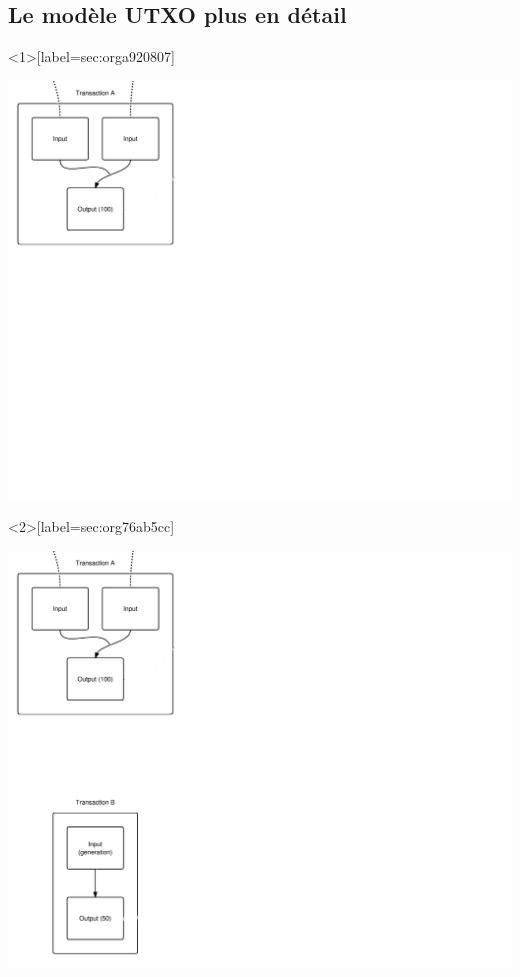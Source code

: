 \documentclass[presentation]{beamer}
\begin{document}
\subsection{Le modèle UTXO plus en détail}
\label{sec:org0e01238}
\begin{frame}<1>[label={sec:orga920807}]{}
\begin{center}
\includegraphics[width=.9\textwidth]{Images/Transaction1.png}
\end{center}
\end{frame}
\begin{frame}<2>[label={sec:org76ab5cc}]{}
\begin{center}
\includegraphics[width=.9\textwidth]{Images/Transaction2.png}
\end{center}
\end{frame}
\end{document}
